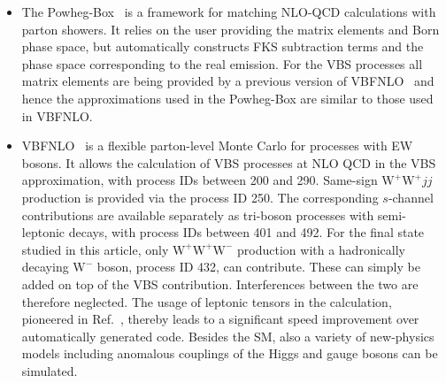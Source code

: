 \documentclass[twocolumn,epjc3]{svjour3} %
\newcommand{\PW}{\ensuremath{\text{W}}\xspace}
\begin{document}
\begin{itemize}
      \item The {\sc Powheg-Box}~\cite{Nason:2004rx,Frixione:2007vw,Alioli:2010xd} is a framework for matching NLO-QCD calculations with parton showers.
    It relies on the user providing the matrix elements and Born phase space, but automatically constructs FKS \cite{Frixione:1995ms} subtraction terms and the phase space corresponding to the real emission.
    For the VBS processes all matrix elements are being provided by a previous version of {\sc VBFNLO}~\cite{Arnold:2008rz, Arnold:2011wj, Baglio:2014uba} and hence the approximations used in the {\sc Powheg-Box} are similar to those used in {\sc VBFNLO}.

      \item {\sc VBFNLO}~\cite{Arnold:2008rz, Arnold:2011wj, Baglio:2014uba} is a flexible
        parton-level Monte Carlo for processes with EW bosons. It
        allows the calculation of VBS processes at NLO QCD in the VBS
        approximation, with process IDs between 200 and 290. Same-sign
        $\PW^+\PW^+jj$ production is provided via the process ID 250. The corresponding
        $s$-channel contributions are available separately as tri-boson processes with
        semi-leptonic decays, with process IDs between 401 and 492. For the
        final state studied in this article, only $\PW^+\PW^+\PW^-$
        production with a hadronically decaying $\PW^-$ boson, process ID 432,
        can contribute. These can simply be added on top of the VBS
        contribution. Interferences between the two are therefore neglected.
        The usage of leptonic tensors in the calculation, pioneered in
        Ref.~\cite{Jager:2006zc}, thereby leads to a significant speed improvement over
        automatically generated code.  Besides the SM, also a variety of
        new-physics models including anomalous couplings of the Higgs and gauge
        bosons can be simulated.
        

\end{itemize}
\end{document}

